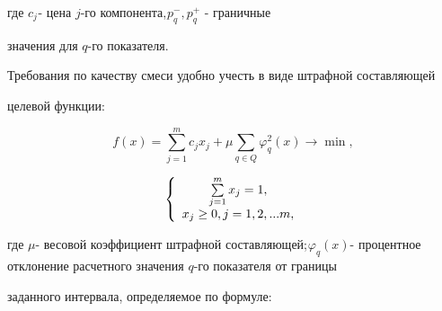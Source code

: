 \documentclass [12pt]{article}
\begin{document}
\noindent

где $c_j _{ }$- цена $j$-го компонента,$_{ }p_q^ - ,p_q^ + $ - граничные 

значения для $q$-го показателя.



Требования по качеству смеси удобно учесть в виде штрафной составляющей 

целевой функции: 





\begin{equation}

\label{eq5}

f(x) = \sum\limits_{j = 1}^m {c_j x_j + \mu \sum\limits_{q \in Q} {\varphi 

_q^2 (x)} } \to \min ,

\end{equation}









\begin{equation}

\label{eq6}

\left\{ {{\begin{array}{*{20}c}

 {\sum\limits_{j = 1}^m {x_j = 1,} } \\

 {x_j \ge 0,j = 1,2,...m,} \\

\end{array} }} \right.

\end{equation}







\noindent

где $\mu $- весовой коэффициент штрафной составляющей;$_{ }\varphi _q 

(x)$- процентное отклонение расчетного значения $q$-го показателя от границы 

заданного интервала, определяемое по формуле: 
\end{document}
